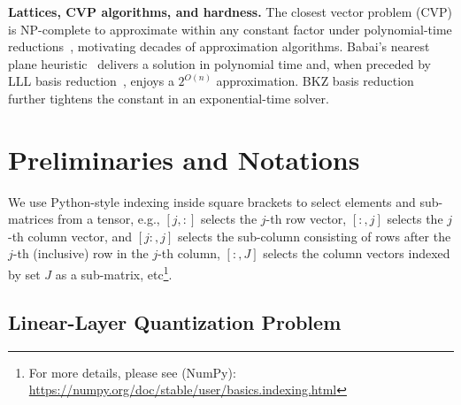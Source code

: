 \documentclass{article} %
\begin{document}
\textbf{Lattices, CVP algorithms, and hardness.}
The closest vector problem (CVP) is NP-complete to approximate within any constant factor under polynomial-time reductions~\citep{vEB81, micciancio2002complexity, Dinur2003}, motivating decades of approximation algorithms.
Babai's nearest plane heuristic~\citep{babai1986} delivers a solution in polynomial time and, when preceded by LLL basis reduction~\citep{lenstra1982lll}, enjoys a $2^{O \left( n \right)}$ approximation.
BKZ basis reduction~\citep{kannan1987cvp} further tightens the constant in an exponential-time solver.

\section{Preliminaries and Notations}
\label{sec:prelims}

We use Python-style indexing inside square brackets to select elements and sub-matrices from a tensor, e.g., $[j, :]$ selects the $j$-th row vector, $[:, j]$ selects the $j$-th column vector, and $[j:, j]$ selects the sub-column consisting of rows after the $j$-th (inclusive) row in the $j$-th column, $[:, J]$ selects the column vectors indexed by set $J$ as a sub-matrix, etc\footnote{For more details, please see (NumPy): \url{https://numpy.org/doc/stable/user/basics.indexing.html}}.

\subsection{Linear-Layer Quantization Problem}
\label{sec:prelims_quant}
\end{document}
